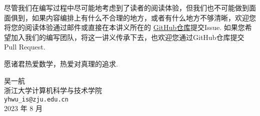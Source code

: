 尽管我们在编写过程中尽可能地考虑到了读者的阅读体验，但我们也不可能做到面面俱到，如果内容编排上有什么不合理的地方，或者有什么地方不够清晰，欢迎您将您的阅读体验通过邮件或直接在本讲义所在的 \href{https://github.com/yhwu-is/Linear-Algebra-Left-Undone}{GitHub仓库}提交Issue. 如果您希望加入我们的编写团队，将这一讲义传承下去，也欢迎您通过GitHub仓库提交Pull Request.

愿诸君热爱数学，热爱对真理的追求.

\begin{flushright}
    \kaishu
    吴一航 \\
    浙江大学计算机科学与技术学院 \\
    \verb|yhwu_is@zju.edu.cn| \\
    2023 年 8 月
\end{flushright}
